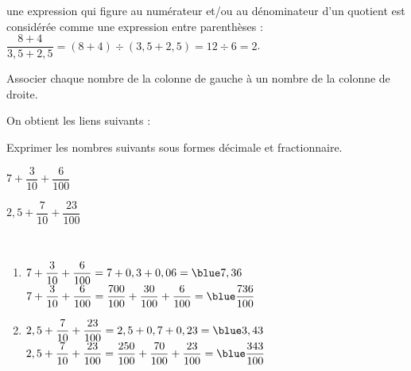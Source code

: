 \documentclass[nocrop]{sesamanuel_college_5e_new}
\begin{document}
\begin{remarque}
   une expression qui figure au numérateur et/ou au dénominateur d'un quotient est considérée comme une expression entre parenthèses : \\
   $\dfrac{8+4}{3,5+2,5} = (8+4)\div(3,5+2,5) =12\div6 =2$.
\end{remarque}


\exercicesbase

\begin{colonne*exercice}

\begin{exercice} %
   Associer chaque nombre de la colonne de gauche à un nombre de la colonne de droite. \\
\end{exercice}

\begin{corrige}
   On obtient les liens suivants : \\
\end{corrige}

\bigskip


\begin{exercice} %
   Exprimer les nombres suivants sous formes décimale et fractionnaire. \smallskip
   \begin{colenumerate}{2}
      \item $7+\dfrac{3}{10}+\dfrac{6}{100}$
      \item $2,5+\dfrac{7}{10}+\dfrac{23}{100}$
   \end{colenumerate}
\end{exercice}

\begin{corrige}
   \ \\ [-5mm]
   \begin{enumerate}
      \item $7+\dfrac{3}{10}+\dfrac{6}{100} = 7+0,3+0,06 ={\blue 7,36}$ \\ [2mm]
         $7+\dfrac{3}{10}+\dfrac{6}{100} =\dfrac{700}{100}+\dfrac{30}{100}+\dfrac{6}{100} ={\blue \dfrac{736}{100}}$ \medskip
      \item $2,5+\dfrac{7}{10}+\dfrac{23}{100} = 2,5+0,7+0,23 ={\blue 3,43}$ \\ [2mm]
         $2,5+\dfrac{7}{10}+\dfrac{23}{100} =\dfrac{250}{100}+\dfrac{70}{100}+\dfrac{23}{100} ={\blue \dfrac{343}{100}}$
   \end{enumerate}
\end{corrige}


\end{colonne*exercice}
\end{document}
